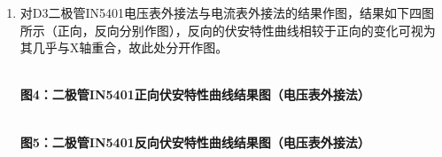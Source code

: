 \documentclass[a4paper]{article}
\begin{document}
\begin{enumerate}
    \item 对D3二极管IN5401电压表外接法与电流表外接法的结果作图，结果如下四图所示（正向，反向分别作图），反向的伏安特性曲线相较于正向的变化可视为其几乎与X轴重合，故此处分开作图。
    \begin{center}
        \\ 
        \bfseries{}\songti 图4：二极管IN5401正向伏安特性曲线结果图（电压表外接法）
    \end{center}
    \begin{center}
        \\
        \bfseries{}\songti 图5：二极管IN5401反向伏安特性曲线结果图（电压表外接法）
    \end{center}
    \begin{center}

\end{center}
\end{enumerate}
\end{document}
